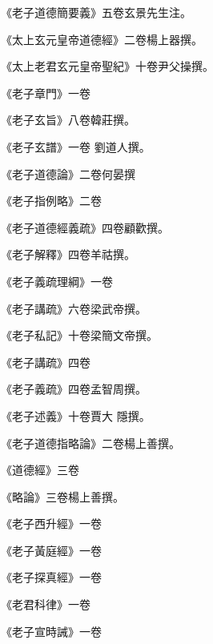 \begin{pinyinscope}
 《老子道德簡要義》五卷玄景先生注。



 《太上玄元皇帝道德經》二卷楊上器撰。



 《太上老君玄元皇帝聖紀》十卷尹父操撰。



 《老子章門》一卷



 《老子玄旨》八卷韓莊撰。



 《老子玄譜》一卷
 劉道人撰。



 《老子道德論》二卷何晏撰



 《老子指例略》二卷



 《老子道德經義疏》四卷顧歡撰。



 《老子解釋》四卷羊祜撰。



 《老子義疏理綱》一卷



 《老子講疏》六卷梁武帝撰。



 《老子私記》十卷梁簡文帝撰。



 《老子講疏》四卷



 《老子義疏》四卷孟智周撰。



 《老子述義》十卷賈大
 隱撰。



 《老子道德指略論》二卷楊上善撰。



 《道德經》三卷



 《略論》三卷楊上善撰。



 《老子西升經》一卷



 《老子黃庭經》一卷



 《老子探真經》一卷



 《老君科律》一卷



 《老子宣時誡》一卷




\end{pinyinscope}
